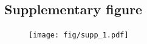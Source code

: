 \documentclass[sn-mathphys-num]{sn-jnl}%
\theoremstyle{thmstyleone}%
\theoremstyle{thmstyletwo}%
\theoremstyle{thmstylethree}%
\begin{document}
\begin{appendices}
\subsection{Supplementary figure}\label{secS1}



\begin{figure}[!htb] 
	\centering
	\texttt{[image: fig/supp\_1.pdf]}
	\caption{} \label{fig:supp_1}
\end{figure}









\end{appendices}



%
\end{document}
